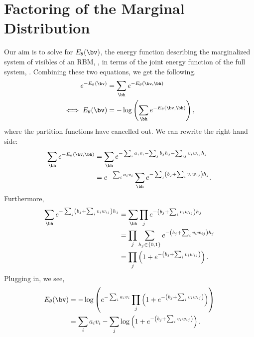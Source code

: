 \section{Factoring of the Marginal Distribution}\label{sec:marginal}
Our aim is to solve for $E_\theta(\bv)$, the energy function describing the
marginalized system of visibles of an RBM,
, in terms of the joint energy
function of the full system, . Combining these two
equations, we get the following.%
\begin{align}
  e^{-E_\theta(\bv)}&=\sum_{\bh}e^{-E_\theta(\bv,\bh)}\\
  \iff E_\theta(\bv) &= -\log\left(\sum_{\bh}e^{-E_\theta(\bv,\bh)}\right),
\end{align}%
%
where the partition functions have cancelled out.  We can rewrite the
right hand side:%
\begin{align}%
  \sum_{\bh}e^{-E_\theta(\bv,\bh)}&= \sum_{\bh}e^{-\sum_i a_i v_i-\sum_j b_j h_j - \sum_{ij} v_i w_{ij} h_j }\\
                           &=e^{-\sum_i a_i v_i} \sum_{\bh}e^{-\sum_j \left(b_j + \sum_{i} v_i w_{ij}\right) h_j}.\\
\end{align}%
Furthermore,%
\begin{align}%
  \sum_{\bh}e^{-\sum_j \left(b_j + \sum_{i} v_i w_{ij}\right) h_j} &=\sum_{\bh }\prod_j e^{-\left(b_j + \sum_{i} v_i w_{ij}\right) h_j }\\
                                                                  &=\prod_{j}\sum_{h_j\in\{0,1\}}e^{-\left(b_j + \sum_{i} v_i w_{ij}\right) h_j }\\
                                                                  &=\prod_{j}\left(1 + e^{-\left(b_j + \sum_{i} v_i w_{ij}\right)}\right).
\end{align}%
Plugging in, we see,%
\begin{align}%
  E_\theta(\bv)&=-\log\left(e^{-\sum_i a_i v_i}\prod_{j}\left(1 + e^{-\left(b_j + \sum_{i} v_i w_{ij}\right)}\right)\right)\\
          &=\sum_i a_i v_i -\sum_j \log\left(1 + e^{-\left(b_j + \sum_{i} v_i w_{ij}\right)}\right).
\end{align}%

